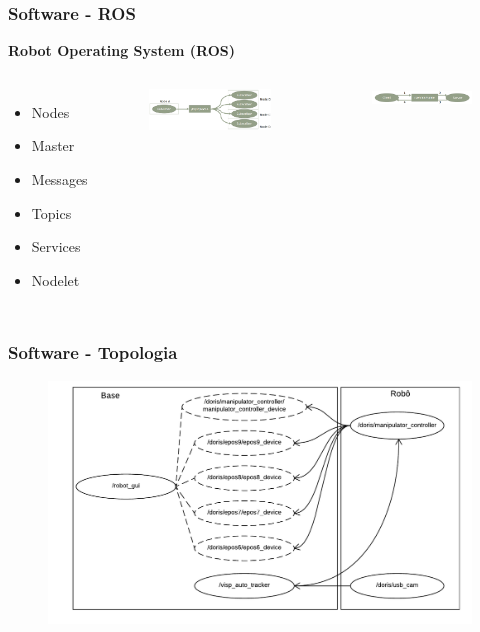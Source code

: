 \documentclass{beamer}
\begin{document}
\begin{frame}
\frametitle{Software - ROS}
\textbf{Robot Operating System (ROS)}
\begin{columns}[c] %

\begin{itemize}
\item Nodes
\item Master
\item Messages
\item Topics
\item Services
\item Nodelet
\end{itemize}

\begin{figure}
  \includegraphics[width=\linewidth]{./img/topics.png}
\end{figure}
\begin{figure}
  \includegraphics[width=\linewidth]{./img/services.png}
\end{figure}
\end{columns}
\end{frame}


\begin{frame}
\frametitle{Software - Topologia}
\begin{figure}
\includegraphics[width=\linewidth]{./img/nodes_simple.pdf}
\end{figure}
\end{frame}
\end{document}
